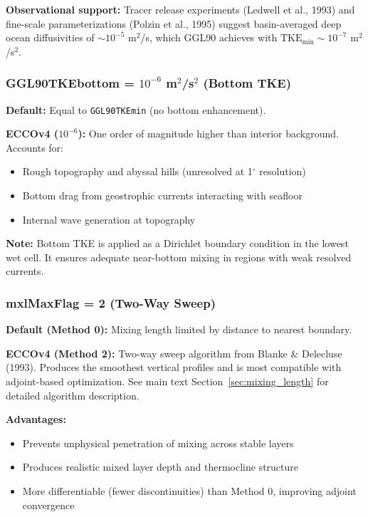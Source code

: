 \documentclass[12pt,letterpaper]{article}
\newcommand{\TKE}{\mathrm{TKE}}
\begin{document}
\textbf{Observational support:} Tracer release experiments (Ledwell et al., 1993) and fine-scale parameterizations (Polzin et al., 1995) suggest basin-averaged deep ocean diffusivities of $\sim 10^{-5}$ m$^2$/s, which GGL90 achieves with $\TKE_{\mathrm{min}} \sim 10^{-7}$ m$^2$/s$^2$.

\subsubsection{GGL90TKEbottom = $10^{-6}$ m$^2$/s$^2$ (Bottom TKE)}

\textbf{Default:} Equal to \texttt{GGL90TKEmin} (no bottom enhancement).

\textbf{ECCOv4 ($10^{-6}$):} One order of magnitude higher than interior background. Accounts for:
\begin{itemize}[leftmargin=*]
  \item Rough topography and abyssal hills (unresolved at 1$^\circ$ resolution)
  \item Bottom drag from geostrophic currents interacting with seafloor
  \item Internal wave generation at topography
\end{itemize}

\textbf{Note:} Bottom TKE is applied as a Dirichlet boundary condition in the lowest wet cell. It ensures adequate near-bottom mixing in regions with weak resolved currents.

\subsubsection{mxlMaxFlag = 2 (Two-Way Sweep)}

\textbf{Default (Method 0):} Mixing length limited by distance to nearest boundary.

\textbf{ECCOv4 (Method 2):} Two-way sweep algorithm from Blanke \& Delecluse (1993). Produces the smoothest vertical profiles and is most compatible with adjoint-based optimization. See main text Section~\ref{sec:mixing_length} for detailed algorithm description.

\textbf{Advantages:}
\begin{itemize}[leftmargin=*]
  \item Prevents unphysical penetration of mixing across stable layers
  \item Produces realistic mixed layer depth and thermocline structure
  \item More differentiable (fewer discontinuities) than Method 0, improving adjoint convergence
\end{itemize}
\end{document}
